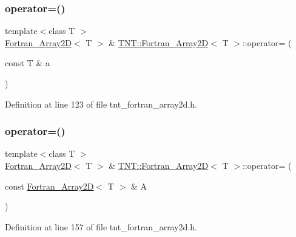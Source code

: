 \subsubsection{\texorpdfstring{operator=()}{operator=()}\hspace{0.1cm}{\footnotesize\ttfamily [1/2]}}
{\footnotesize\ttfamily template$<$class T $>$ \\
\hyperlink{classTNT_1_1Fortran__Array2D}{Fortran\+\_\+\+Array2D}$<$ T $>$ \& \hyperlink{classTNT_1_1Fortran__Array2D}{T\+N\+T\+::\+Fortran\+\_\+\+Array2D}$<$ T $>$\+::operator= (\begin{DoxyParamCaption}\item[{const T \&}]{a }\end{DoxyParamCaption})\hspace{0.3cm}{\ttfamily [inline]}}



Definition at line 123 of file tnt\+\_\+fortran\+\_\+array2d.\+h.

\mbox{\label{classTNT_1_1Fortran__Array2D_aa4aa0816e95aadc83366b9faa77ba643}} 
\subsubsection{\texorpdfstring{operator=()}{operator=()}\hspace{0.1cm}{\footnotesize\ttfamily [2/2]}}
{\footnotesize\ttfamily template$<$class T $>$ \\
\hyperlink{classTNT_1_1Fortran__Array2D}{Fortran\+\_\+\+Array2D}$<$ T $>$ \& \hyperlink{classTNT_1_1Fortran__Array2D}{T\+N\+T\+::\+Fortran\+\_\+\+Array2D}$<$ T $>$\+::operator= (\begin{DoxyParamCaption}\item[{const \hyperlink{classTNT_1_1Fortran__Array2D}{Fortran\+\_\+\+Array2D}$<$ T $>$ \&}]{A }\end{DoxyParamCaption})\hspace{0.3cm}{\ttfamily [inline]}}



Definition at line 157 of file tnt\+\_\+fortran\+\_\+array2d.\+h.

\mbox{\label{classTNT_1_1Fortran__Array2D_a3367c5ff1caa02a1f3676b125f2accf5}} 
